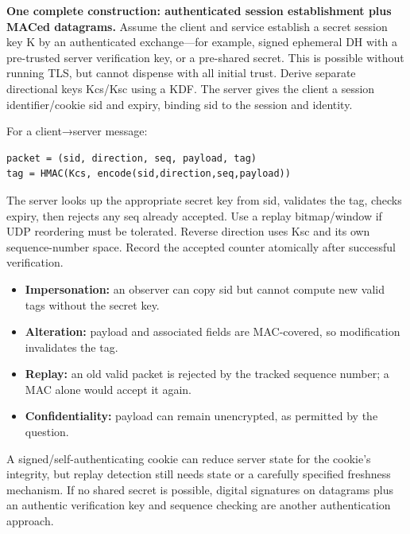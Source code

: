 \documentclass[11pt,a4paper]{article}
\begin{document}
\textbf{One complete construction: authenticated session establishment plus MACed datagrams.} Assume the client and service establish a secret session key K by an authenticated exchange—for example,\allowbreak{} signed ephemeral DH with a pre-trusted server verification key,\allowbreak{} or a pre-shared secret. This is possible without running TLS,\allowbreak{} but cannot dispense with all initial trust. Derive separate directional keys Kcs/\allowbreak{}Ksc using a KDF. The server gives the client a session identifier/\allowbreak{}cookie sid and expiry,\allowbreak{} binding sid to the session and identity.


For a client→server message:



\begin{Verbatim}[breaklines=true,breakanywhere=true,fontsize=\small,frame=single,rulecolor=\color{PanelBorder}]
packet = (sid, direction, seq, payload, tag)
tag = HMAC(Kcs, encode(sid,direction,seq,payload))
\end{Verbatim}

The server looks up the appropriate secret key from sid,\allowbreak{} validates the tag,\allowbreak{} checks expiry,\allowbreak{} then rejects any seq already accepted. Use a replay bitmap/\allowbreak{}window if UDP reordering must be tolerated. Reverse direction uses Ksc and its own sequence-number space. Record the accepted counter atomically after successful verification.



\begin{itemize}

\item \textbf{Impersonation:} an observer can copy sid but cannot compute new valid tags without the secret key.

\item \textbf{Alteration:} payload and associated fields are MAC-covered,\allowbreak{} so modification invalidates the tag.

\item \textbf{Replay:} an old valid packet is rejected by the tracked sequence number; a MAC alone would accept it again.

\item \textbf{Confidentiality:} payload can remain unencrypted,\allowbreak{} as permitted by the question.

\end{itemize}

A signed/\allowbreak{}self-authenticating cookie can reduce server state for the cookie’s integrity,\allowbreak{} but replay detection still needs state or a carefully specified freshness mechanism. If no shared secret is possible,\allowbreak{} digital signatures on datagrams plus an authentic verification key and sequence checking are another authentication approach.
\end{document}

